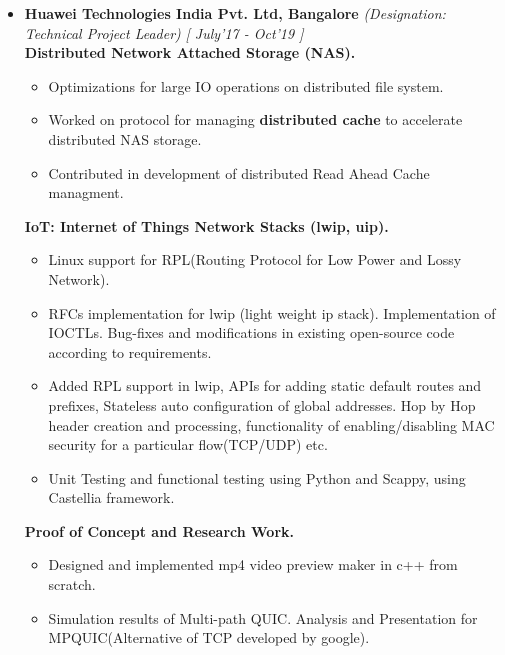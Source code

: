 \documentclass[a4paper,10pt]{article}
\begin{document}
\vspace{-0.25cm}
\vspace{-0.2cm}
\begin{itemize}
\item \textbf{Huawei Technologies India Pvt. Ltd, Bangalore} 
\emph{(Designation: Technical Project Leader)} \hfill {\emph{[ July'17 - Oct'19 ]}}  \\
\textbf{Distributed Network Attached Storage (NAS).}\\[-0.6cm]
\begin{itemize}
	\item Optimizations for large IO operations on distributed file system.\\[-0.5cm]
	\item Worked on protocol for managing \textbf{distributed cache} to accelerate distributed NAS storage.\\[-0.5cm]
	\item Contributed in development of distributed Read Ahead Cache managment.
\end{itemize}
\textbf{IoT: Internet of Things Network Stacks (lwip, uip).}\\[-0.6cm]
\begin{itemize} 
	\item Linux support for RPL(Routing Protocol for Low Power and Lossy Network).\\[-0.5cm]
	\item RFCs implementation for lwip (light weight ip stack). Implementation of IOCTLs. Bug-fixes and modifications in existing open-source code according to requirements.\\[-0.5cm]
	\item Added RPL support in lwip, APIs for adding static default routes and prefixes, Stateless auto configuration of global addresses. Hop by Hop header creation and processing, functionality of enabling/disabling MAC security for a particular flow(TCP/UDP) etc.\\[-0.5cm]
	\item Unit Testing and functional testing using Python and Scappy, using Castellia framework.\\[-0.5cm]
\end{itemize}
\textbf{Proof of Concept and Research Work.}\\[-0.6cm]
\begin{itemize}  	
	\item Designed and implemented mp4 video preview maker in c++ from scratch. \\[-0.5cm]
	\item Simulation results of Multi-path QUIC. Analysis and Presentation for MPQUIC(Alternative of TCP developed by google).\\[-0.5cm]
\end{itemize}
\end{itemize}
\end{document}
